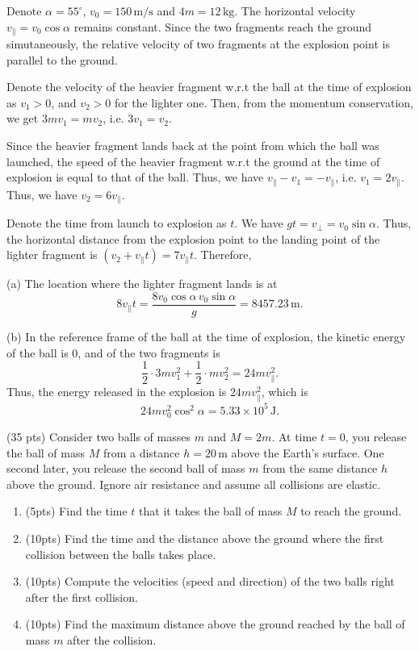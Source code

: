 \documentclass{article}
\begin{document}
\begin{solution}
  Denote \( \alpha=55^\circ \), \( v_0=150\,\mathrm{m/s} \) and \( 4m=12\,\mathrm{kg} \). The horizontal velocity \( v_{\parallel}=v_0\cos \alpha \) remains constant. Since the two fragments reach the ground simutaneously, the relative velocity of two fragments at the explosion point is parallel to the ground.\par
  Denote the velocity of the heavier fragment w.r.t the ball at the time of explosion as \( v_1>0 \), and \( v_2>0 \) for the lighter one. Then, from the momentum conservation, we get \( 3mv_1=mv_2 \), i.e. \( 3v_1=v_2 \). \par
  Since the heavier fragment lands back at the point from which the ball was launched, the speed of the heavier fragment w.r.t the ground at the time of explosion is equal to that of the ball. Thus, we have \( v_{\parallel}-v_1=-v_{\parallel} \), i.e. \( v_1=2v_{\parallel} \). Thus, we have \( v_2=6v_{\parallel} \). \par
  Denote the time from launch to explosion as \( t \). We have \( gt=v_{\perp}=v_0\sin \alpha \). Thus, the horizontal distance from the explosion point to the landing point of the lighter fragment is \( (v_2+v_{\parallel}t)=7v_{\parallel}t \). Therefore, \par
  (a) The location where the lighter fragment lands is at
  \[ 8v_{\parallel}t=\frac{8 v_0\cos\alpha \,v_0\sin \alpha}{g}=8457.23\,\mathrm{m}. \] \par
  (b) In the reference frame of the ball at the time of explosion, the kinetic energy of the ball is \( 0 \), and of the two fragments is
  \[ \frac{1}{2}\cdot 3mv_1^2+\frac{1}{2}\cdot mv_2^2=24mv_{\parallel}^2. \]
  Thus, the energy released in the explosion is \( 24mv_{\parallel}^2 \), which is
  \[ 24mv_0^2\cos^2\alpha=5.33\times 10^5\,\mathrm{J}. \]
\end{solution}



\begin{problem}
(35 pts) Consider two balls of masses $m$ and $M=2m$. At time $t=0$, you release the ball of mass $M$ from a distance $h=20\,\mathrm{m}$ above the Earth's surface. One second later, you release the second ball of mass $m$ from the same distance $h$ above the ground. Ignore air resistance and assume all collisions are elastic.
\begin{enumerate}[label=(\alph*)]
	\item (5pts) Find the time $t$ that it takes the ball of mass $M$ to reach the ground.
	\item (10pts) Find the time and the distance above the ground where the first collision between the balls takes place.
	\item (10pts) Compute the velocities (speed and direction) of the two balls right after the first collision.
	\item (10pts) Find the maximum distance above the ground reached by the ball of mass $m$ after the collision.
\end{enumerate}
\end{problem}
\end{document}
